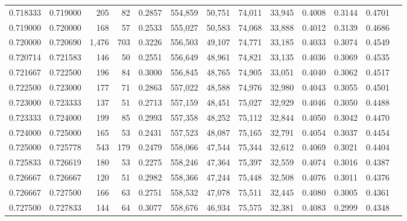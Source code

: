 \begin{tabular}{rrrrrrrrrrrrr}
0.718333 & 0.719000 &   205 &  82 &                                     0.2857 & 554,859 &  50,751 &  74,011 &  33,945 & 0.4008 & 0.3144 & 0.4701 \\
0.719000 & 0.720000 &   168 &  57 &                                     0.2533 & 555,027 &  50,583 &  74,068 &  33,888 & 0.4012 & 0.3139 & 0.4686 \\
0.720000 & 0.720690 & 1,476 & 703 &                                     0.3226 & 556,503 &  49,107 &  74,771 &  33,185 & 0.4033 & 0.3074 & 0.4549 \\
0.720714 & 0.721583 &   146 &  50 &                                     0.2551 & 556,649 &  48,961 &  74,821 &  33,135 & 0.4036 & 0.3069 & 0.4535 \\
0.721667 & 0.722500 &   196 &  84 &                                     0.3000 & 556,845 &  48,765 &  74,905 &  33,051 & 0.4040 & 0.3062 & 0.4517 \\
0.722500 & 0.723000 &   177 &  71 &                                     0.2863 & 557,022 &  48,588 &  74,976 &  32,980 & 0.4043 & 0.3055 & 0.4501 \\
0.723000 & 0.723333 &   137 &  51 &                                     0.2713 & 557,159 &  48,451 &  75,027 &  32,929 & 0.4046 & 0.3050 & 0.4488 \\
0.723333 & 0.724000 &   199 &  85 &                                     0.2993 & 557,358 &  48,252 &  75,112 &  32,844 & 0.4050 & 0.3042 & 0.4470 \\
0.724000 & 0.725000 &   165 &  53 &                                     0.2431 & 557,523 &  48,087 &  75,165 &  32,791 & 0.4054 & 0.3037 & 0.4454 \\
0.725000 & 0.725778 &   543 & 179 &                                     0.2479 & 558,066 &  47,544 &  75,344 &  32,612 & 0.4069 & 0.3021 & 0.4404 \\
0.725833 & 0.726619 &   180 &  53 &                                     0.2275 & 558,246 &  47,364 &  75,397 &  32,559 & 0.4074 & 0.3016 & 0.4387 \\
0.726667 & 0.726667 &   120 &  51 &                                     0.2982 & 558,366 &  47,244 &  75,448 &  32,508 & 0.4076 & 0.3011 & 0.4376 \\
0.726667 & 0.727500 &   166 &  63 &                                     0.2751 & 558,532 &  47,078 &  75,511 &  32,445 & 0.4080 & 0.3005 & 0.4361 \\
0.727500 & 0.727833 &   144 &  64 &                                     0.3077 & 558,676 &  46,934 &  75,575 &  32,381 & 0.4083 & 0.2999 & 0.4348 \\

\end{tabular}
